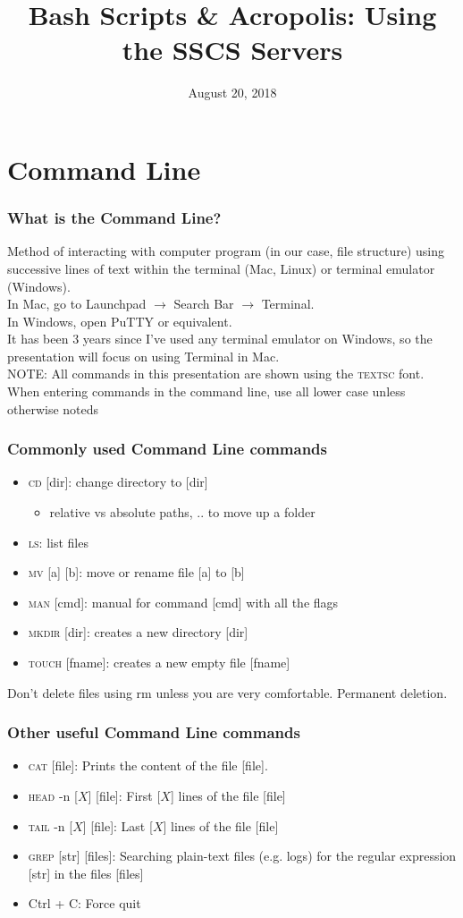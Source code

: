 \documentclass{beamer}
\title[Server]{Bash Scripts \& Acropolis: Using the SSCS Servers}
\institute{\large{EPIC RA Orientation}}
\date{August 20, 2018}
\newcommand{\bi}{\begin{itemize}}
\newcommand{\ei}{\end{itemize}}
\begin{document}
\begin{frame}
	\titlepage
\end{frame}

\section{Command Line}
\begin{frame}
	\frametitle{What is the Command Line?}
	Method of interacting with computer program (in our case, file structure) using successive lines of text within the terminal (Mac, Linux) or terminal emulator (Windows). 
	\\[1em]\pause
	In Mac, go to Launchpad $\to$ Search Bar $\to$ Terminal.
	\\
	In Windows, open PuTTY or equivalent. 
	\\[1em]
	\tiny{It has been 3 years since I've used any terminal emulator on Windows, so the presentation will focus on using Terminal in Mac.}
	\\[1em]
	\tiny{NOTE: All commands in this presentation are shown using the \textsc{textsc} font. When entering commands in the command line, use all lower case unless otherwise noted}s
\end{frame}


\begin{frame}
	\frametitle{Commonly used Command Line commands}
	\bi
		\item \textsc{cd} [dir]: change directory to [dir]
		\bi	
			\item relative vs absolute paths, .. to move up a folder
		\ei
		\item \textsc{ls}: list files
		\item \textsc{mv} [a] [b]: move or rename file [a] to [b]
		\item \textsc{man} [cmd]: manual for command [cmd] with all the flags
		\item \textsc{mkdir} [dir]: creates a new directory [dir]
		\item \textsc{touch} [fname]: creates a new empty file [fname]
	\ei
	Don't delete files using rm unless you are very comfortable. Permanent deletion.
\end{frame}

\begin{frame}
	\frametitle{Other useful Command Line commands}
	\bi
		\item \textsc{cat} [file]: Prints the content of the file [file].
		\item \textsc{head} -n [$X$] [file]: First [$X$] lines of the file [file]
		\item \textsc{tail} -n [$X$] [file]: Last [$X$] lines of the file [file]
		\item \textsc{grep} [str] [files]: Searching plain-text files (e.g. logs) for the regular expression [str] in the files [files]
		\item Ctrl + C: Force quit
	\ei
\end{frame}
\end{document}
